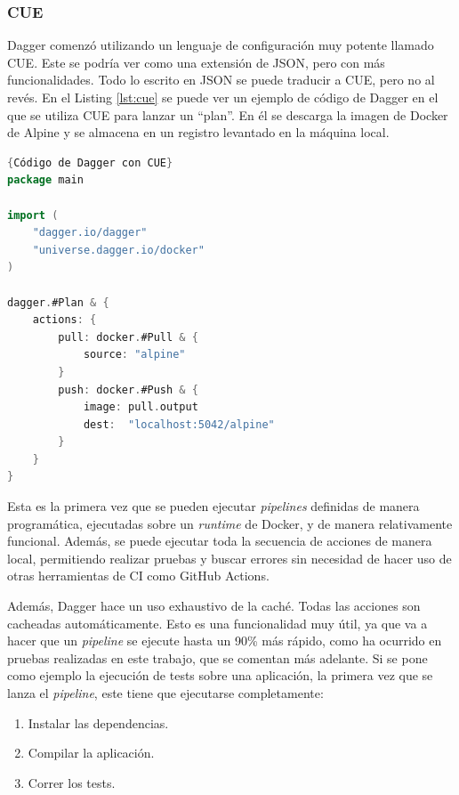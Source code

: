 \subsubsection*{CUE}

Dagger comenzó utilizando un lenguaje de configuración muy potente llamado CUE\cite{cue}. Este se podría ver como una extensión de JSON, pero con más funcionalidades. Todo lo escrito en JSON se puede traducir a CUE, pero no al revés. En el Listing \ref{lst:cue} se puede ver un ejemplo de código de Dagger en el que se utiliza CUE para lanzar un ``plan''. En él se descarga la imagen de Docker de Alpine y se almacena en un registro levantado en la máquina local.

\begin{lstlisting}[language=go,label=lst:cue]{Código de Dagger con CUE}
package main

import (
    "dagger.io/dagger"
    "universe.dagger.io/docker"
)

dagger.#Plan & {
    actions: {
        pull: docker.#Pull & {
            source: "alpine"
        }
        push: docker.#Push & {
            image: pull.output
            dest:  "localhost:5042/alpine"
        }
    }
}
\end{lstlisting}

Esta es la primera vez que se pueden ejecutar \textit{pipelines} definidas de manera programática, ejecutadas sobre un \textit{runtime} de Docker, y de manera relativamente funcional. Además, se puede ejecutar toda la secuencia de acciones de manera local, permitiendo realizar pruebas y buscar errores sin necesidad de hacer uso de otras herramientas de CI como GitHub Actions.

Además, Dagger hace un uso exhaustivo de la caché. Todas las acciones son cacheadas automáticamente. Esto es una funcionalidad muy útil, ya que va a hacer que un \textit{pipeline} se ejecute hasta un 90\% más rápido, como ha ocurrido en pruebas realizadas en este trabajo, que se comentan más adelante. Si se pone como ejemplo la ejecución de tests sobre una aplicación, la primera vez que se lanza el \textit{pipeline}, este tiene que ejecutarse completamente:

\begin{enumerate}
  \item Instalar las dependencias.
  \item Compilar la aplicación.
  \item Correr los tests.
\end{enumerate}

